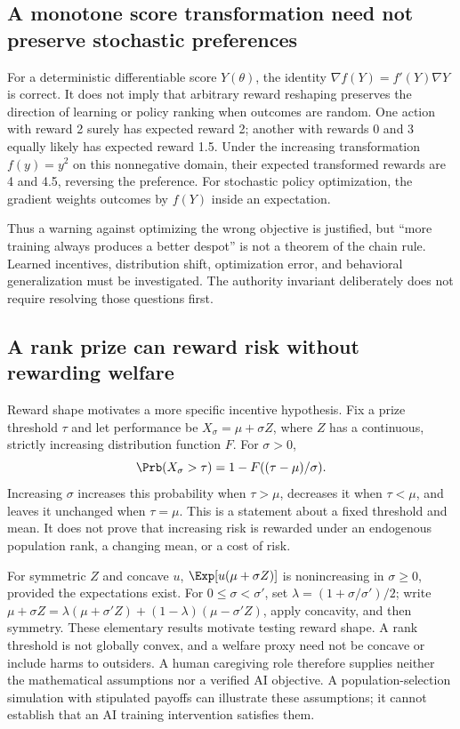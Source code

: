 \subsection{A monotone score transformation need not preserve stochastic preferences}
For a deterministic differentiable score $Y(\theta)$, the identity $\nabla f(Y)=f'(Y)\nabla Y$ is correct. It does not imply that arbitrary reward reshaping preserves the direction of learning or policy ranking when outcomes are random. One action with reward 2 surely has expected reward 2; another with rewards 0 and 3 equally likely has expected reward 1.5. Under the increasing transformation $f(y)=y^2$ on this nonnegative domain, their expected transformed rewards are 4 and 4.5, reversing the preference. For stochastic policy optimization, the gradient weights outcomes by $f(Y)$ inside an expectation.

Thus a warning against optimizing the wrong objective is justified, but ``more training always produces a better despot'' is not a theorem of the chain rule. Learned incentives, distribution shift, optimization error, and behavioral generalization must be investigated. The authority invariant deliberately does not require resolving those questions first.


\subsection{A rank prize can reward risk without rewarding welfare}
Reward shape motivates a more specific incentive hypothesis. Fix a prize threshold $\tau$ and let performance be $X_\sigma=\mu+\sigma Z$, where $Z$ has a continuous, strictly increasing distribution function $F$. For $\sigma>0$,
\[
\Prb(X_\sigma>\tau)=1-F((\tau-\mu)/\sigma).
\]
Increasing $\sigma$ increases this probability when $\tau>\mu$, decreases it when $\tau<\mu$, and leaves it unchanged when $\tau=\mu$. This is a statement about a fixed threshold and mean. It does not prove that increasing risk is rewarded under an endogenous population rank, a changing mean, or a cost of risk.

For symmetric $Z$ and concave $u$, $\Exp[u(\mu+\sigma Z)]$ is nonincreasing in $\sigma\ge0$, provided the expectations exist. For $0\le\sigma<\sigma'$, set $\lambda=(1+\sigma/\sigma')/2$; write $\mu+\sigma Z=\lambda(\mu+\sigma'Z)+(1-\lambda)(\mu-\sigma'Z)$, apply concavity, and then symmetry. These elementary results motivate testing reward shape. A rank threshold is not globally convex, and a welfare proxy need not be concave or include harms to outsiders. A human caregiving role therefore supplies neither the mathematical assumptions nor a verified AI objective. A population-selection simulation with stipulated payoffs can illustrate these assumptions; it cannot establish that an AI training intervention satisfies them.

